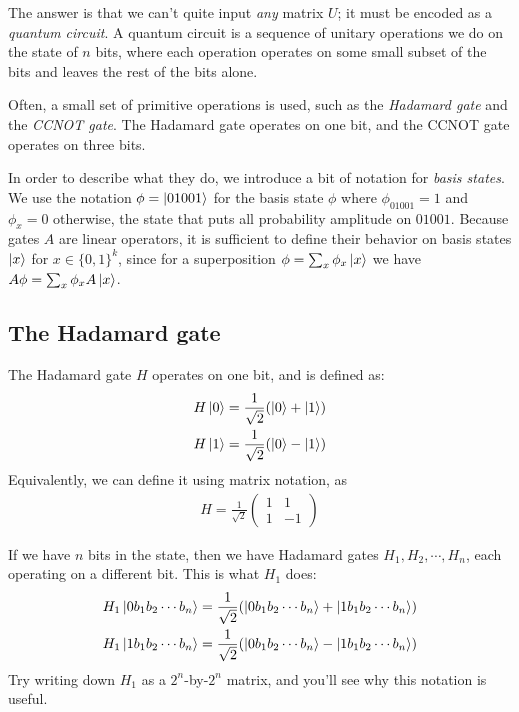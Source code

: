 The answer is that we can't quite input \emph{any} matrix $U$; it must be encoded as a \emph{quantum circuit}.
A quantum circuit is a sequence of unitary operations we do on the state of $n$ bits, where each operation operates on some small subset of the bits and leaves the rest of the bits alone.

Often, a small set of primitive operations is used, such as the \emph{Hadamard gate} and the \emph{CCNOT gate}.
The Hadamard gate operates on one bit, and the CCNOT gate operates on three bits.

In order to describe what they do, we introduce a bit of notation for \emph{basis states}.
We use the notation $\phi = \ket{01001}$ for the basis state $\phi$ where $\phi_{01001} = 1$ and $\phi_x = 0$ otherwise, \ie the state that puts all probability amplitude on $01001$.
Because gates $A$ are linear operators, it is sufficient to define their behavior on basis states $\ket{x}$ for $x \in \{0,1\}^k$,
since for a superposition $\phi = \sum_x \phi_x \ket{x}$ we have $A\phi = \sum_x \phi_x A \ket{x}$.

\subsection{The Hadamard gate}

\newcommand{\Ha}{H}
\newcommand{\CCNOT}{\mathsf{CCNOT}}

The Hadamard gate $\Ha$ operates on one bit, and is defined as:
\begin{align*}
  \Ha\ket{0} = \frac{1}{\sqrt{2}}(\ket{0} + \ket{1}) \\
  \Ha\ket{1} = \frac{1}{\sqrt{2}}(\ket{0} - \ket{1})
\end{align*}
Equivalently, we can define it using matrix notation, as
\begin{align*}
  \Ha = \frac{1}{\sqrt{2}}\begin{pmatrix}
    1 & 1 \\
    1 & -1
  \end{pmatrix}
\end{align*}

If we have $n$ bits in the state, then we have Hadamard gates $\Ha_1, \Ha_2, \cdots, \Ha_n$, each operating on a different bit.
This is what $\Ha_1$ does:
\begin{align}
  \Ha_1 \ket{0 b_1 b_2 \cdots b_n} = \frac{1}{\sqrt{2}}(\ket{0 b_1 b_2 \cdots b_n} + \ket{1 b_1 b_2 \cdots b_n}) \label{eqn:hadamard}\\
  \Ha_1 \ket{1 b_1 b_2 \cdots b_n} = \frac{1}{\sqrt{2}}(\ket{0 b_1 b_2 \cdots b_n} - \ket{1 b_1 b_2 \cdots b_n})
\end{align}
Try writing down $H_1$ as a $2^n$-by-$2^n$ matrix, and you'll see why this notation is useful.

